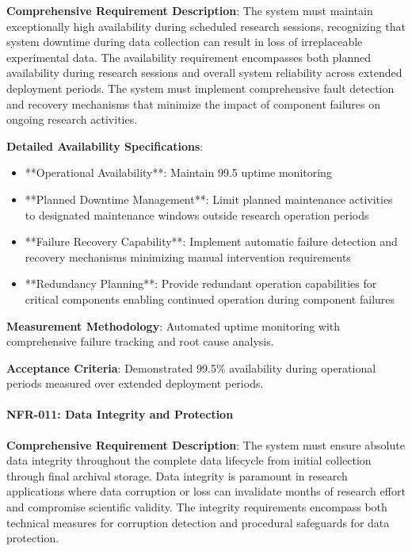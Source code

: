 \documentclass[12pt,a4paper]{article}
\begin{document}
\textbf{Comprehensive Requirement Description}: The system must maintain exceptionally high availability during scheduled
research sessions, recognizing that system downtime during data collection can result in loss of irreplaceable
experimental data. The availability requirement encompasses both planned availability during research sessions and
overall system reliability across extended deployment periods. The system must implement comprehensive fault detection
and recovery mechanisms that minimize the impact of component failures on ongoing research activities.

\textbf{Detailed Availability Specifications}:

\begin{itemize}
\item **Operational Availability**: Maintain 99.5%
  uptime monitoring
\item **Planned Downtime Management**: Limit planned maintenance activities to designated maintenance windows outside
  research operation periods
\item **Failure Recovery Capability**: Implement automatic failure detection and recovery mechanisms minimizing manual
  intervention requirements
\item **Redundancy Planning**: Provide redundant operation capabilities for critical components enabling continued operation
  during component failures

\end{itemize}
\textbf{Measurement Methodology}: Automated uptime monitoring with comprehensive failure tracking and root cause analysis.

\textbf{Acceptance Criteria}: Demonstrated 99.5\% availability during operational periods measured over extended deployment
periods.

\paragraph{NFR-011: Data Integrity and Protection}

\textbf{Comprehensive Requirement Description}: The system must ensure absolute data integrity throughout the complete data
lifecycle from initial collection through final archival storage. Data integrity is paramount in research applications
where data corruption or loss can invalidate months of research effort and compromise scientific validity. The integrity
requirements encompass both technical measures for corruption detection and procedural safeguards for data protection.
\end{document}

